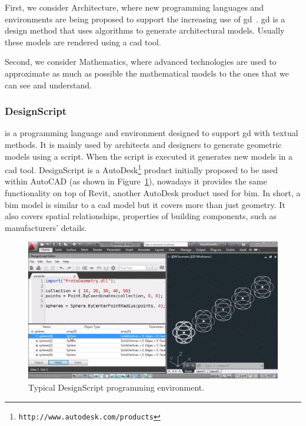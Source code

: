 First, we consider Architecture, where new programming languages and environments are being proposed to support the increasing use of \ac{gd}~\cite{mccormack2004generative}. \ac{gd} is a design method that uses algorithms to generate architectural models. Usually these models are rendered using a \ac{cad} tool. 

Second, we consider Mathematics, where advanced technologies are used to approximate as much as possible the mathematical models to the ones that we can see and understand.

\subsubsection{DesignScript~\cite{aish2012designscript}} is a programming language and environment designed to support \ac{gd} with textual methods. It is mainly used by architects and designers to generate geometric models using a script. When the script is executed it generates new models in a \ac{cad} tool. DesignScript is a AutoDesk\footnote{\texttt{http://www.autodesk.com/products}} product initially proposed to be used within AutoCAD (as shown in Figure~\ref{fig:ds}), nowadays it provides the same functionality on top of Revit, another AutoDesk product used for \ac{bim}. In short, a \ac{bim} model is similar to a \ac{cad} model but it covers more than just geometry. It also covers spatial relationships, properties of building components, such as manufacturers' details.

\begin{figure}[!htbp]
  \centering
  \includegraphics[width=1.0\textwidth]{img/designScriptIDE}
    \caption{Typical DesignScript programming environment.} 
  \label{fig:ds}
\end{figure} 

